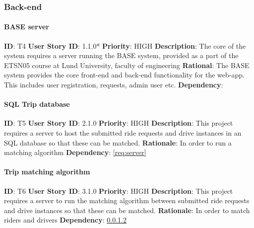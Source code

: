 \documentclass{article}
\begin{document}
\subsubsection{Back-end}

\paragraph{BASE server}\label{req:}
\textbf{ID}: T4\newline
\textbf{User Story ID}: 1.1.0* \newline
\textbf{Priority}: HIGH\newline
\textbf{Description}: The core of the system requires a server running the BASE system, provided as a part of the ETSN05 course at Lund University, faculty of engineering\newline
\textbf{Rational}: The BASE system provides the core front-end and back-end functionality for the web-app. This includes user registration, requests, admin user etc.\newline
\textbf{Dependency}: \newline

\paragraph{SQL Trip database}\label{req:tripDatabase}
\textbf{ID}: T5\newline
\textbf{User Story ID}: 2.1.0\newline
\textbf{Priority}: HIGH\newline
\textbf{Description}: This project requires a server to host the submitted ride requests and drive instances in an SQL database so that these can be matched.\newline
\textbf{Rationale}: In order to run a matching algorithm\newline
\textbf{Dependency}: \ref{req:server}

\paragraph{Trip matching algorithm}\label{req:matchAlgorithm}
\textbf{ID}: T6\newline
\textbf{User Story ID}: 3.1.0\newline
\textbf{Priority}: HIGH\newline
\textbf{Description}: This project requires a server to run the matching algorithm between submitted ride requests and drive instances so that these can be matched.\newline
\textbf{Rationale}: In order to match riders and drivers\newline
\textbf{Dependency}: \ref{req:tripDatabase}
\end{document}
